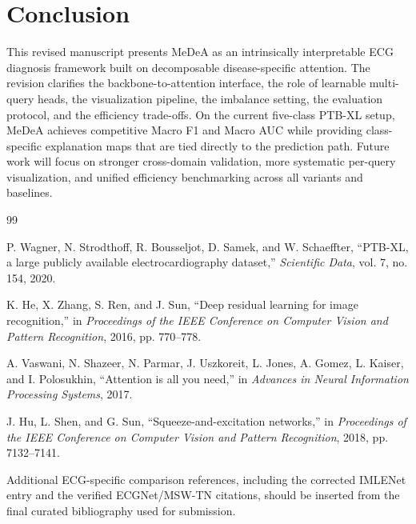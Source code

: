 \documentclass[11pt]{article}
\begin{document}
\section{Conclusion}

This revised manuscript presents MeDeA as an intrinsically interpretable ECG diagnosis framework built on decomposable disease-specific attention. The revision clarifies the backbone-to-attention interface, the role of learnable multi-query heads, the visualization pipeline, the imbalance setting, the evaluation protocol, and the efficiency trade-offs. On the current five-class PTB-XL setup, MeDeA achieves competitive Macro F1 and Macro AUC while providing class-specific explanation maps that are tied directly to the prediction path. Future work will focus on stronger cross-domain validation, more systematic per-query visualization, and unified efficiency benchmarking across all variants and baselines.

\begin{thebibliography}{99}

P. Wagner, N. Strodthoff, R. Bousseljot, D. Samek, and W. Schaeffter,
``PTB-XL, a large publicly available electrocardiography dataset,''
\emph{Scientific Data}, vol. 7, no. 154, 2020.

K. He, X. Zhang, S. Ren, and J. Sun,
``Deep residual learning for image recognition,''
in \emph{Proceedings of the IEEE Conference on Computer Vision and Pattern Recognition}, 2016, pp. 770--778.

A. Vaswani, N. Shazeer, N. Parmar, J. Uszkoreit, L. Jones, A. Gomez, L. Kaiser, and I. Polosukhin,
``Attention is all you need,''
in \emph{Advances in Neural Information Processing Systems}, 2017.

J. Hu, L. Shen, and G. Sun,
``Squeeze-and-excitation networks,''
in \emph{Proceedings of the IEEE Conference on Computer Vision and Pattern Recognition}, 2018, pp. 7132--7141.

Additional ECG-specific comparison references, including the corrected IMLENet entry and the verified ECGNet/MSW-TN citations, should be inserted from the final curated bibliography used for submission.

\end{thebibliography}
\end{document}
